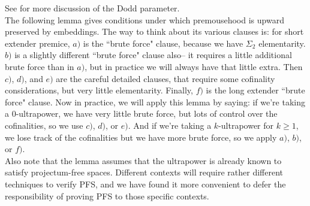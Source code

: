 \documentclass[12pt]{article}
\begin{document}
See \cite{zeman square proof} for more discussion of the Dodd parameter.\\





The following lemma gives conditions under which premousehood is upward preserved by embeddings.  The way to think about its various clauses is: for short extender premice, $a)$ is the ``brute force" clause, because we have $\Sigma_2$ elementarity.  $b)$ is a slightly different ``brute force" clause also-- it requires a little additional brute force than in $a)$, but in practice we will always have that little extra.  Then $c)$, $d)$, and $e)$ are the careful detailed clauses, that require some cofinality considerations, but very little elementarity.  Finally, $f)$ is the long extender ``brute force" clause.  Now in practice, we will apply this lemma by saying: if we're taking a $0$-ultrapower, we have very little brute force, but lots of control over the cofinalities, so we use $c)$, $d)$, or $e)$.  And if we're taking a $k$-ultrapower for $k \geq 1$, we lose track of the cofinalities but we have more brute force, so we apply $a)$, $b)$, or $f)$.\\

Also note that the lemma assumes that the ultrapower is already known to satisfy projectum-free spaces. Different contexts will require rather different techniques to verify PFS, and we have found it more convenient to defer the responsibility of proving PFS to those specific contexts.\\
\end{document}
